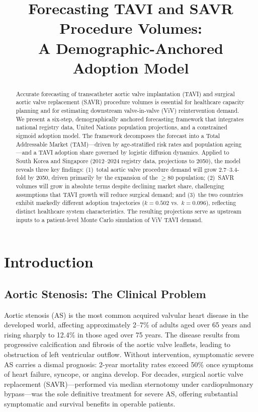 \documentclass[12pt, a4paper]{article}
\title{\textbf{Forecasting TAVI and SAVR Procedure Volumes:\\A Demographic-Anchored Adoption Model}}
\author{
}
\date{}
\begin{document}
\maketitle

\begin{abstract}
\noindent
Accurate forecasting of transcatheter aortic valve implantation (TAVI) and surgical aortic valve replacement (SAVR) procedure volumes is essential for healthcare capacity planning and for estimating downstream valve-in-valve (ViV) reintervention demand. We present a six-step, demographically anchored forecasting framework that integrates national registry data, United Nations population projections, and a constrained sigmoid adoption model. The framework decomposes the forecast into a Total Addressable Market (TAM)---driven by age-stratified risk rates and population ageing---and a TAVI adoption share governed by logistic diffusion dynamics. Applied to South Korea and Singapore (2012--2024 registry data, projections to 2050), the model reveals three key findings: (1)~total aortic valve procedure demand will grow 2.7--3.4-fold by 2050, driven primarily by the expansion of the $\geq$80 population; (2)~SAVR volumes will grow in absolute terms despite declining market share, challenging assumptions that TAVI growth will reduce surgical demand; and (3)~the two countries exhibit markedly different adoption trajectories ($k = 0.502$ vs.\ $k = 0.096$), reflecting distinct healthcare system characteristics. The resulting projections serve as upstream inputs to a patient-level Monte Carlo simulation of ViV TAVI demand.
\end{abstract}

\clearpage
\tableofcontents
\clearpage


\section{Introduction}

\subsection{Aortic Stenosis: The Clinical Problem}

Aortic stenosis (AS) is the most common acquired valvular heart disease in the developed world, affecting approximately 2--7\% of adults aged over 65 years and rising sharply to 12.4\% in those aged over 75 years. The disease results from progressive calcification and fibrosis of the aortic valve leaflets, leading to obstruction of left ventricular outflow. Without intervention, symptomatic severe AS carries a dismal prognosis: 2-year mortality rates exceed 50\% once symptoms of heart failure, syncope, or angina develop. For decades, surgical aortic valve replacement (SAVR)---performed via median sternotomy under cardiopulmonary bypass---was the sole definitive treatment for severe AS, offering substantial symptomatic and survival benefits in operable patients.
\end{document}
